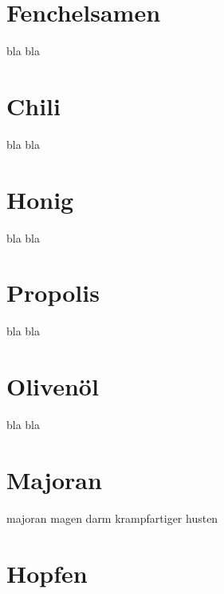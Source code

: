 \section{Fenchelsamen}
\label{   }

bla bla



\section{Chili}
\label{   }

bla bla



\section{Honig}
\label{   }

bla bla



\section{Propolis}
\label{   }

bla bla



\section{Olivenöl}
\label{   }

bla bla



\section{Majoran}
\label{   }

majoran
magen darm
krampfartiger husten


\section{Hopfen}
\label{   }

